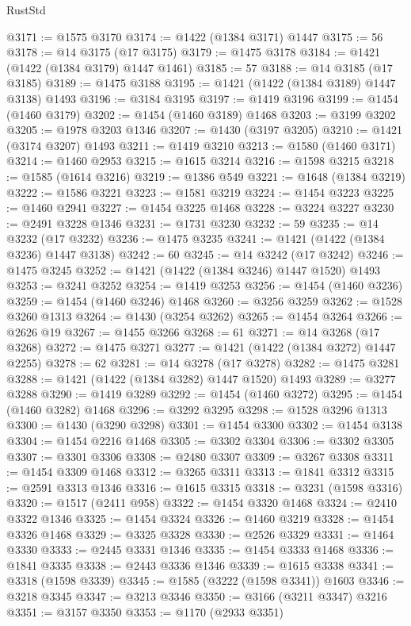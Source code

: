 \begin{lexlean}{RustStd}
\begin{coremodule}
@3171 := @1575 @3170
@3174 := @1422 (@1384 @3171) @1447
@3175 := 56
@3178 := @14 @3175 (@17 @3175)
@3179 := @1475 @3178
@3184 := @1421 (@1422 (@1384 @3179) @1447 @1461)
@3185 := 57
@3188 := @14 @3185 (@17 @3185)
@3189 := @1475 @3188
@3195 := @1421 (@1422 (@1384 @3189) @1447 @3138) @1493
@3196 := @3184 @3195
@3197 := @1419 @3196
@3199 := @1454 (@1460 @3179)
@3202 := @1454 (@1460 @3189) @1468
@3203 := @3199 @3202
@3205 := @1978 @3203 @1346
@3207 := @1430 (@3197 @3205)
@3210 := @1421 (@3174 @3207) @1493
@3211 := @1419 @3210
@3213 := @1580 (@1460 @3171)
@3214 := @1460 @2953
@3215 := @1615 @3214
@3216 := @1598 @3215
@3218 := @1585 (@1614 @3216)
@3219 := @1386 @549
@3221 := @1648 (@1384 @3219)
@3222 := @1586 @3221
@3223 := @1581 @3219
@3224 := @1454 @3223
@3225 := @1460 @2941
@3227 := @1454 @3225 @1468
@3228 := @3224 @3227
@3230 := @2491 @3228 @1346
@3231 := @1731 @3230
@3232 := 59
@3235 := @14 @3232 (@17 @3232)
@3236 := @1475 @3235
@3241 := @1421 (@1422 (@1384 @3236) @1447 @3138)
@3242 := 60
@3245 := @14 @3242 (@17 @3242)
@3246 := @1475 @3245
@3252 := @1421 (@1422 (@1384 @3246) @1447 @1520) @1493
@3253 := @3241 @3252
@3254 := @1419 @3253
@3256 := @1454 (@1460 @3236)
@3259 := @1454 (@1460 @3246) @1468
@3260 := @3256 @3259
@3262 := @1528 @3260 @1313
@3264 := @1430 (@3254 @3262)
@3265 := @1454 @3264
@3266 := @2626 @19
@3267 := @1455 @3266
@3268 := 61
@3271 := @14 @3268 (@17 @3268)
@3272 := @1475 @3271
@3277 := @1421 (@1422 (@1384 @3272) @1447 @2255)
@3278 := 62
@3281 := @14 @3278 (@17 @3278)
@3282 := @1475 @3281
@3288 := @1421 (@1422 (@1384 @3282) @1447 @1520) @1493
@3289 := @3277 @3288
@3290 := @1419 @3289
@3292 := @1454 (@1460 @3272)
@3295 := @1454 (@1460 @3282) @1468
@3296 := @3292 @3295
@3298 := @1528 @3296 @1313
@3300 := @1430 (@3290 @3298)
@3301 := @1454 @3300
@3302 := @1454 @3138
@3304 := @1454 @2216 @1468
@3305 := @3302 @3304
@3306 := @3302 @3305
@3307 := @3301 @3306
@3308 := @2480 @3307
@3309 := @3267 @3308
@3311 := @1454 @3309 @1468
@3312 := @3265 @3311
@3313 := @1841 @3312
@3315 := @2591 @3313 @1346
@3316 := @1615 @3315
@3318 := @3231 (@1598 @3316)
@3320 := @1517 (@2411 @958)
@3322 := @1454 @3320 @1468
@3324 := @2410 @3322 @1346
@3325 := @1454 @3324
@3326 := @1460 @3219
@3328 := @1454 @3326 @1468
@3329 := @3325 @3328
@3330 := @2526 @3329
@3331 := @1464 @3330
@3333 := @2445 @3331 @1346
@3335 := @1454 @3333 @1468
@3336 := @1841 @3335
@3338 := @2443 @3336 @1346
@3339 := @1615 @3338
@3341 := @3318 (@1598 @3339)
@3345 := @1585 (@3222 (@1598 @3341)) @1603
@3346 := @3218 @3345
@3347 := @3213 @3346
@3350 := @3166 (@3211 @3347) @3216
@3351 := @3157 @3350
@3353 := @1170 (@2933 @3351)

\end{coremodule}
\end{lexlean}
